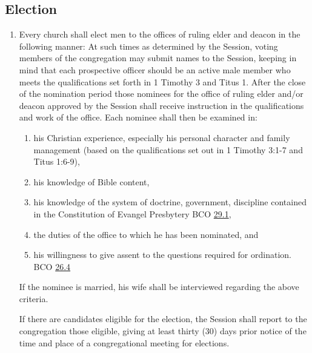 \documentclass[
]{book}
\providecommand{\tightlist}{%
  \setlength{\itemsep}{0pt}\setlength{\parskip}{0pt}}
\begin{document}
\hypertarget{election}{%
\subsection*{\texorpdfstring{\protect\hypertarget{26}{\href{}{}}Election}{Election}}\label{election}}

\begin{enumerate}
\def\labelenumi{\arabic{enumi}.}
\item
  Every church shall elect men to the offices of ruling elder and deacon in the following manner: At such times as determined by the Session, voting members of the congregation may submit names to the Session, keeping in mind that each prospective officer should be an active male member who meets the qualifications set forth in 1 Timothy 3 and Titus 1. After the close of the nomination period those nominees for the office of ruling elder and/or deacon approved by the Session shall receive instruction in the qualifications and work of the office. Each nominee shall then be examined in:

  \begin{enumerate}
  \def\labelenumii{\alph{enumii}.}
  \tightlist
  \item
    his Christian experience, especially his personal character and family management (based on the qualifications set out in 1 Timothy 3:1-7 and Titus 1:6-9),
  \item
    his knowledge of Bible content,
  \item
    his knowledge of the system of doctrine, government, discipline contained in the Constitution of Evangel Presbytery BCO \protect\hyperlink{29.1}{29.1},
  \item
    the duties of the office to which he has been nominated, and
  \item
    his willingness to give assent to the questions required for ordination. BCO \protect\hyperlink{26.4}{26.4}
  \end{enumerate}

  If the nominee is married, his wife shall be interviewed regarding the above criteria.

  If there are candidates eligible for the election, the Session shall report to the congregation those eligible, giving at least thirty (30) days prior notice of the time and place of a congregational meeting for elections.


\end{enumerate}
\end{document}
